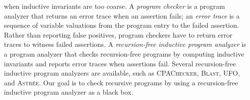 when inductive invariants are too coarse. 
A \emph{program checker} is
a program analyzer that returns an error trace when an assertion
fails; an \emph{error trace} is a sequence of variable valuations from
the program entry to the failed assertion. Rather than reporting false
positives, program checkers have to return error traces to witness 
failed assertions. %
A \emph{recursion-free
  inductive program analyzer} is a program analyzer that checks
recursion-free programs by computing inductive invariants and reports
error traces when assertions fail. Several recursion-free
inductive program analyzers are available, such as \textsc{CPAChecker},
\textsc{Blast}, \textsc{UFO}, and \textsc{Astr\'ee}. Our goal is to check
recursive programs by using a recursion-free inductive program analyzer
as a black box.
